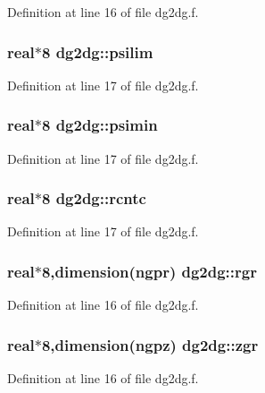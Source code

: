 Definition at line 16 of file dg2dg.f.\hypertarget{namespacedg2dg_5abf8e2b92fc98dcb269d20099028451}{
\subsubsection[psilim]{\setlength{\rightskip}{0pt plus 5cm}real$\ast$8 {\bf dg2dg::psilim}}}
\label{namespacedg2dg_5abf8e2b92fc98dcb269d20099028451}




Definition at line 17 of file dg2dg.f.\hypertarget{namespacedg2dg_b51d79dfb19c6827c5e2540a7f283f23}{
\subsubsection[psimin]{\setlength{\rightskip}{0pt plus 5cm}real$\ast$8 {\bf dg2dg::psimin}}}
\label{namespacedg2dg_b51d79dfb19c6827c5e2540a7f283f23}




Definition at line 17 of file dg2dg.f.\hypertarget{namespacedg2dg_19f3394ca4f1ef71cd6de32f9d199b7b}{
\subsubsection[rcntc]{\setlength{\rightskip}{0pt plus 5cm}real$\ast$8 {\bf dg2dg::rcntc}}}
\label{namespacedg2dg_19f3394ca4f1ef71cd6de32f9d199b7b}




Definition at line 17 of file dg2dg.f.\hypertarget{namespacedg2dg_f36a00895bcd828127ea8f8a115978ce}{
\subsubsection[rgr]{\setlength{\rightskip}{0pt plus 5cm}real$\ast$8,dimension({\bf ngpr}) {\bf dg2dg::rgr}}}
\label{namespacedg2dg_f36a00895bcd828127ea8f8a115978ce}




Definition at line 16 of file dg2dg.f.\hypertarget{namespacedg2dg_35685ffad7953d2a38165725ba540d49}{
\subsubsection[zgr]{\setlength{\rightskip}{0pt plus 5cm}real$\ast$8,dimension({\bf ngpz}) {\bf dg2dg::zgr}}}
\label{namespacedg2dg_35685ffad7953d2a38165725ba540d49}




Definition at line 16 of file dg2dg.f.